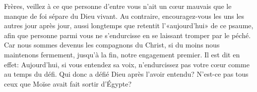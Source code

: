 Frères, veillez à ce que personne d’entre vous n’ait un cœur mauvais
		que le manque de foi sépare du Dieu vivant.
Au contraire, encouragez-vous les uns les autres jour après jour,
	aussi longtemps que retentit l’«aujourd’hui» de ce psaume,
	afin que personne parmi vous ne s’endurcisse en se laissant tromper par le péché.
Car nous sommes devenus les compagnons du Christ,
	si du moins nous maintenons fermement, jusqu’à la fin, notre engagement premier.
Il est dit en effet:
	Aujourd’hui, si vous entendez sa voix,
	n’endurcissez pas votre cœur comme au temps du défi.
Qui donc a défié Dieu après l’avoir entendu?
N’est-ce pas tous ceux que Moïse avait fait sortir d’Égypte?
